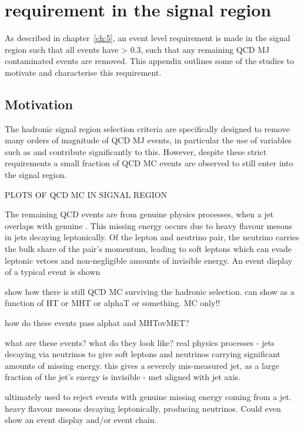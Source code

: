 \label{ch:app_dphistar}


\chapter{\mindphistar requirement in the signal region}

As described in chapter~\ref{ch:5}, an event level requirement is made in the
signal region such that all events have \mindphistar > 0.3, such that any
remaining QCD MJ contaminated events are removed. This appendix outlines some of
the studies to motivate and characterise this requirement.

\section{Motivation}

The hadronic signal region selection criteria are specifically
designed to remove many orders of magnitude of QCD MJ events, in particular the
use of variables such as \alphat and \mhtmet contribute significantly to this.
However, despite these strict requirements a small fraction of QCD MC events are
observed to still enter into the signal region.

PLOTS OF QCD MC IN SIGNAL REGION

The remaining QCD events are from genuine physics processes, when a jet overlaps
with genuine \met. This missing energy occurs due to heavy flavour mesons in
jets decaying leptonically. Of the lepton and neutrino pair, the neutrino
carries the bulk share of the pair's momentum, leading to soft leptons which
can evade leptonic vetoes and non-negligible amounts of invisible energy. An
event display of a typical event is shown 

show how there is still QCD MC surviving the hadronic selection. can show as a
function of HT or MHT or alphaT or something. MC only!!

how do these events pass alphat and MHTovMET?

what are these events? what do they look like? real physics processes - jets
decaying via neutrinos to give soft leptons and neutrinos carrying significant
amounts of missing energy. this gives a severely mis-measured jet, as a
large fraction of the jet's energy is invisible - met aligned with jet axis.

ultimately used to reject events with genuine missing energy coming from a jet.
heavy flavour mesons decaying leptonically, producing neutrinos. Could even show
an event display and/or event chain.

